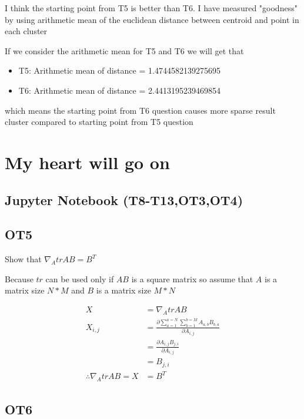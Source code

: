 \documentclass[12pt, a4paper]{article}
\begin{document}
I think the starting point from T5 is better than T6. I have measured "goodness" 
by using arithmetic mean of the euclidean distance between centroid and point in each cluster

\noindent If we consider the arithmetic mean for T5 and T6 we will get that

\begin{itemize}
    \item T5: Arithmetic mean of distance = 1.4744582139275695
    \item T6: Arithmetic mean of distance = 2.4413195239469854
\end{itemize}

which means the starting point from T6 question causes more sparse result cluster compared to starting point from T5 question

\pagebreak
\section{My heart will go on}
\subsection{Jupyter Notebook (T8-T13,OT3,OT4)}


\pagebreak

\subsection{OT5}

Show that $\nabla_{A}trAB = B^{T}$

Because $tr$ can be used only if $AB$ is a square matrix so assume that $A$ is a matrix size $N * M$ and $B$ is a matrix size $M * N$

\begin{equation}
    \begin{split}
        X &= \nabla_{A}trAB \\
        X_{i,j} &= \frac{\partial \sum_{a=1}^{a=N} \sum_{b=1}^{b=M} A_{a,b}B_{b,a}}{\partial A_{i,j}} \\
                &= \frac{\partial A_{i,j} B_{j,i}}{\partial A_{i,j}} \\
                &= B_{j,i} \\
        \therefore \nabla_{A}trAB = X &= B^{T}
    \end{split}
\end{equation}

\subsection{OT6}
\end{document}
